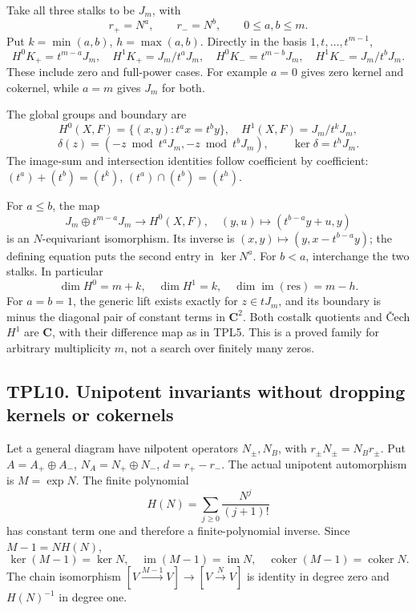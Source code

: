 Take all three stalks to be \(J_m\), with \[
r_+=N^a,\qquad r_-=N^b,\qquad 0\le a,b\le m.
\tag{TPL9.1}
\] Put \(k=\min(a,b)\), \(h=\max(a,b)\). Directly in the basis
\(1,t,\ldots,t^{m-1}\), \[
H^0K_+=t^{m-a}J_m,\quad H^1K_+=J_m/t^aJ_m,
\quad
H^0K_-=t^{m-b}J_m,\quad H^1K_-=J_m/t^bJ_m.
\tag{TPL9.2}
\] These include zero and full-power cases. For example \(a=0\) gives
zero kernel and cokernel, while \(a=m\) gives \(J_m\) for both.

The global groups and boundary are \[
H^0(X,F)=\{(x,y):t^ax=t^by\},\quad H^1(X,F)=J_m/t^kJ_m,
\tag{TPL9.3}
\] \[
\delta(z)=(-z\bmod t^aJ_m,-z\bmod t^bJ_m),
\qquad \ker\delta=t^hJ_m.
\tag{TPL9.4}
\] The image-sum and intersection identities follow coefficient by
coefficient: \((t^a)+(t^b)=(t^k)\), \((t^a)\cap(t^b)=(t^h)\).

For \(a\le b\), the map \[
J_m\oplus t^{m-a}J_m\to H^0(X,F),
\quad(y,u)\mapsto(t^{b-a}y+u,y)
\tag{TPL9.5}
\] is an \(N\)-equivariant isomorphism. Its inverse is
\((x,y)\mapsto(y,x-t^{b-a}y)\); the defining equation puts the second
entry in \(\ker N^a\). For \(b<a\), interchange the two stalks. In
particular \[
\dim H^0=m+k,\quad\dim H^1=k,\quad
\dim\operatorname{im}(\mathrm{res})=m-h.
\tag{TPL9.6}
\] For \(a=b=1\), the generic lift exists exactly for \(z\in tJ_m\), and
its boundary is minus the diagonal pair of constant terms in
\(\mathbf C^2\). Both costalk quotients and Čech \(H^1\) are
\(\mathbf C\), with their difference map as in TPL5. This is a proved
family for arbitrary multiplicity \(m\), not a search over finitely many
zeros.

\subsection{TPL10. Unipotent invariants without dropping kernels or
cokernels}\label{tpl10.-unipotent-invariants-without-dropping-kernels-or-cokernels}

Let a general diagram have nilpotent operators \(N_\pm,N_B\), with
\(r_\pm N_\pm=N_Br_\pm\). Put \(A=A_+\oplus A_-\),
\(N_A=N_+\oplus N_-\), \(d=r_+-r_-\). The actual unipotent automorphism
is \(M=\exp N\). The finite polynomial \[
H(N)=\sum_{j\ge0}\frac{N^j}{(j+1)!}
\tag{TPL10.1}
\] has constant term one and therefore a finite-polynomial inverse.
Since \(M-1=NH(N)\), \[
\ker(M-1)=\ker N,\quad \operatorname{im}(M-1)=\operatorname{im}N,
\quad\operatorname{coker}(M-1)=\operatorname{coker}N.
\tag{TPL10.2}
\] The chain isomorphism \([V\xrightarrow{M-1}V]\to[V\xrightarrow N V]\)
is identity in degree zero and \(H(N)^{-1}\) in degree one.

